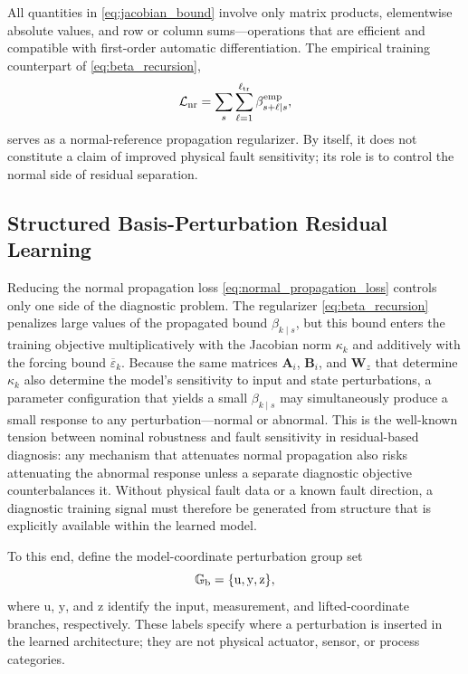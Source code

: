\documentclass[journal]{IEEEtran}
\newcommand{\1}{\bm 1}
\begin{document}
All quantities in \eqref{eq:jacobian_bound} involve only matrix products,
elementwise absolute values, and row or column sums---operations that are
efficient and compatible with first-order automatic differentiation. The
empirical training counterpart of \eqref{eq:beta_recursion},
\begin{equation}
\mathcal L_{\rm nr}=
\sum_s\sum_{\ell=1}^{\ell_{\rm tr}}
\beta_{s+\ell\mid s}^{\rm emp},
\label{eq:normal_propagation_loss}
\end{equation}
serves as a normal-reference propagation regularizer. By itself, it does not
constitute a claim of improved physical fault sensitivity; its role is to
control the normal side of residual separation.

\subsection{Structured Basis-Perturbation Residual Learning}
Reducing the normal propagation loss \eqref{eq:normal_propagation_loss}
controls only one side of the diagnostic problem. The regularizer
\eqref{eq:beta_recursion} penalizes large values of the propagated bound
$\beta_{k\mid s}$, but this bound enters the training objective
multiplicatively with the Jacobian norm $\kappa_k$ and additively with the
forcing bound $\overline{\varepsilon}_k$. Because the same matrices $\bm A_i$,
$\bm B_i$, and $\bm W_z$ that determine $\kappa_k$ also determine the
model's sensitivity to input and state perturbations, a parameter
configuration that yields a small $\beta_{k\mid s}$ may simultaneously
produce a small response to any perturbation---normal or abnormal. This is the
well-known tension between nominal robustness and fault sensitivity in
residual-based diagnosis: any mechanism that attenuates normal propagation
also risks attenuating the abnormal response unless a separate diagnostic
objective counterbalances it. Without physical fault data or a
known fault direction, a diagnostic training signal must therefore be
generated from structure that is explicitly available within the learned
model.

To this end, define the model-coordinate perturbation group set
\begin{equation}
\mathbb G_{\rm b}=\{\mathrm u,\mathrm y,\mathrm z\},
\label{eq:group_set}
\end{equation}
where $\mathrm u$, $\mathrm y$, and $\mathrm z$ identify the input,
measurement, and lifted-coordinate branches, respectively. These labels
specify where a perturbation is inserted in the learned architecture; they are
not physical actuator, sensor, or process categories.
\end{document}

